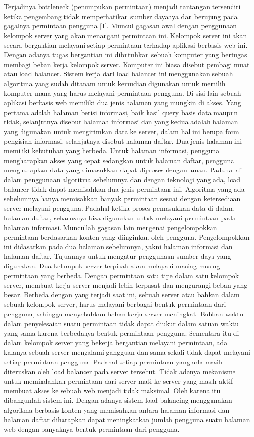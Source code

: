 \documentclass{ta-its}
\begin{document}
\indent Terjadinya bottleneck (penumpukan permintaan) menjadi tantangan tersendiri ketika pengembang tidak memperhatikan sumber dayanya dan berujung pada gagalnya permintaan pengguna [1]. Muncul gagasan awal dengan penggunaan kelompok server yang akan menangani permintaan ini. Kelompok server ini akan secara bergantian melayani setiap permintaan terhadap aplikasi berbasis web ini. Dengan adanya tugas bergantian ini dibutuhkan sebuah komputer yang bertugas membagi beban kerja kelompok server. Komputer ini biasa disebut pembagi muat atau load balancer. Sistem kerja dari load balancer ini menggunakan sebuah algoritma yang sudah ditanam untuk kemudian digunakan untuk memilih komputer mana yang harus melayani permintaan pengguna. 
Di sisi lain sebuah aplikasi berbasis web memiliki dua jenis halaman yang mungkin di akses. Yang pertama adalah halaman berisi informasi, baik hasil query basis data maupun tidak, selanjutnya disebut halaman informasi dan yang kedua adalah halaman yang digunakan untuk mengirimkan data ke server, dalam hal ini berupa form pengisian informasi, selanjutnya disebut halaman daftar. 
Dua jenis halaman ini memiliki kebutuhan yang berbeda. Untuk halaman informasi, pengguna mengharapkan akses yang cepat sedangkan untuk halaman daftar, pengguna mengharapkan data yang dimasukkan dapat diproses dengan aman. Padahal di dalam penggunaan algoritma sebelumnya dan dengan teknologi yang ada, load balancer tidak dapat memisahkan dua jenis permintaan ini. Algoritma yang ada sebelumnya hanya memisahkan banyak permintaan sesuai dengan ketersediaan server melayani pengguna. Padahal ketika proses pemasukkan data di dalam halaman daftar, seharusnya bisa digunakan untuk melayani permintaan pada halaman informasi.
Muncullah gagasan lain mengenai pengelompokkan permintaan berdasarkan konten yang diinginkan oleh pengguna. Pengelompokkan ini didasarkan pada dua halaman sebelumnya, yakni halaman informasi dan halaman daftar. Tujuannya untuk mengatur penggunaan sumber daya yang digunakan. Dua kelompok server terpisah akan melayani masing-masing permintaan yang berbeda. Dengan permintaan satu tipe dalam satu kelompok server, membuat kerja server menjadi lebih terpusat dan mengurangi beban yang besar.
Berbeda dengan yang terjadi saat ini, sebuah server atau bahkan dalam sebuah kelompok server, harus melayani berbagai bentuk permintaan dari pengguna, sehingga menyebabkan beban kerja server meningkat. Bahkan waktu dalam penyelesaian suatu permintaan tidak dapat diukur dalam satuan waktu yang sama karena berbedanya bentuk permintaan pengguna.
Sementara itu di dalam kelompok server yang bekerja bergantian melayani permintaan, ada kalanya sebuah server mengalami gangguan dan sama sekali tidak dapat melayani setiap permintaan pengguna. Padahal setiap permintaan yang ada masih diteruskan oleh load balancer pada server tersebut. Tidak adanya mekanisme untuk memindahkan permintaan dari server mati ke server yang masih aktif membuat akses ke sebuah web menjadi tidak maksimal.
Oleh karena itu dibangunlah sistem ini. Dengan adanya sistem load balancing menggunakan algoritma berbasis konten yang memisahkan antara halaman informasi dan halaman daftar diharapkan dapat meningkatkan jumlah pengguna suatu halaman web dengan banyaknya bentuk permintaan dari pengguna.
\end{document}
